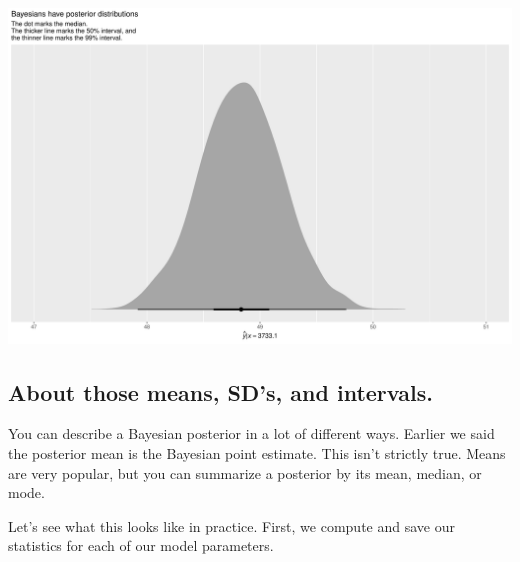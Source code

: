 \documentclass[
  letterpaper,
  DIV=11,
  numbers=noendperiod]{scrartcl}
\begin{document}
\includegraphics{Bayes_Lab_1_files/figure-pdf/unnamed-chunk-46-1.pdf}

\subsection{About those means, SD's, and
intervals.}\label{about-those-means-sds-and-intervals.}

You can describe a Bayesian posterior in a lot of different ways.
Earlier we said the posterior mean is the Bayesian point estimate. This
isn't strictly true. Means are very popular, but you can summarize a
posterior by its mean, median, or mode.

Let's see what this looks like in practice. First, we compute and save
our statistics for each of our model parameters.
\end{document}
